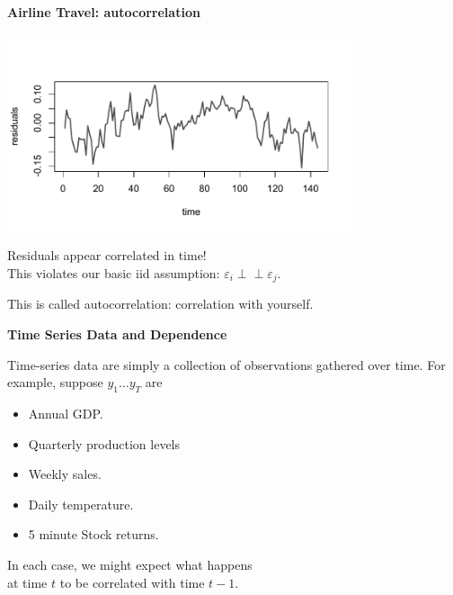 \documentclass[12pt,xcolor=svgnames]{beamer}
\newcommand{\nv}{\color{Navy}}
\newcommand{\theme}{\color{Maroon}}
\newcommand{\indep}{\perp\!\!\!\perp}
\newcommand{\sk}{\vspace{.5cm}}
\begin{document}
\begin{frame}

{\bf Airline Travel: {\theme autocorrelation}}

\sk
\includegraphics[width=4in]{../graphs/airlineresid}

\sk
Residuals appear correlated in time!\\
This violates our basic {iid} assumption: $\varepsilon_i \indep \varepsilon_j$.

This is called {\nv autocorrelation}: correlation with yourself.


\end{frame}

\begin{frame}

{\bf Time Series Data and Dependence}

\sk

Time-series data are simply a collection of observations
gathered over time.
For example, suppose $y_1 \ldots y_T$ are
\begin{itemize}
\item  Annual GDP.
\item  Quarterly production levels
\item  Weekly sales.
\item  Daily temperature. 
\item  5 minute Stock returns.
\end{itemize}

\sk\nv
In each case, we might expect what happens \\at time $t$ to be
correlated with time $t-1$.

\end{frame}
\end{document}
